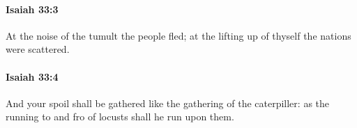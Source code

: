 		\paragraph{Isaiah 33:3} %
			\label{ISAIAH-33-3}

			At the noise of the tumult the people fled; at the lifting up of thyself the nations were scattered.


		\paragraph{Isaiah 33:4} %
			\label{ISAIAH-33-4}

			And your spoil shall be gathered like the gathering of the caterpiller: as the running to and fro of locusts shall he run upon them.


